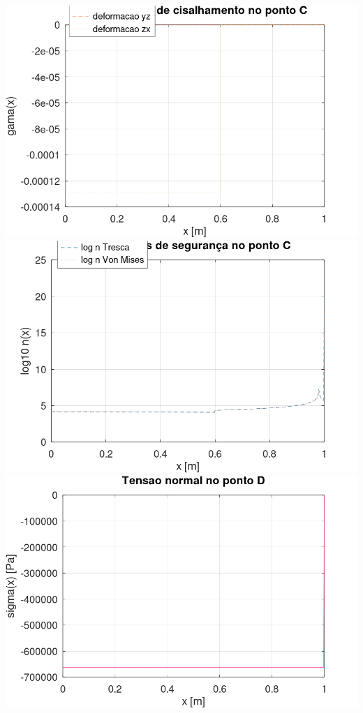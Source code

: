 \documentclass[10pt]{article}
\begin{document}
\begin{center}
    \includegraphics[scale=0.25]{figure34.png}
    \includegraphics[scale=0.25]{figure35.png}
    \includegraphics[scale=0.25]{figure36.png}

\end{center}
\end{document}
